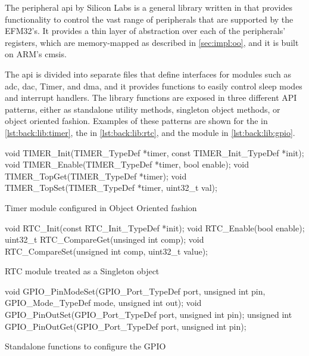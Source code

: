 The {\emlib} peripheral \gls{api} by Silicon Labs is a general library written in {\C} that provides functionality to control the vast range of peripherals that are supported by the EFM32's.
It provides a thin layer of abstraction over each of the peripherals' registers, which are memory-mapped as described in \autoref{sec:impl:oo}, and it is built on ARM's \gls{cmsis}.

The \gls{api} is divided into separate files that define interfaces for modules such as \gls{adc}, \gls{dac}, Timer, and \gls{dma}, and it provides functions to easily control sleep modes and interrupt handlers.
The library functions are exposed in three different API patterns, either as standalone utility methods, singleton object methods, or {\C} object oriented fashion.
Examples of these patterns are shown for the  in \autoref{lst:back:lib:timer}, the  in \autoref{lst:back:lib:rtc}, and the  module in \autoref{lst:back:lib:gpio}.

\begin{listing}[H]
  \begin{ccode}
void TIMER_Init(TIMER_TypeDef *timer,
                const TIMER_Init_TypeDef *init);
void TIMER_Enable(TIMER_TypeDef *timer, bool enable);
void TIMER_TopGet(TIMER_TypeDef *timer);
void TIMER_TopSet(TIMER_TypeDef *timer, uint32_t val);
  \end{ccode}
  \caption{Timer module configured in {\C} Object Oriented fashion}
  \label{lst:back:lib:timer}
\end{listing}

\begin{listing}[H]
  \begin{ccode}
void RTC_Init(const RTC_Init_TypeDef *init);
void RTC_Enable(bool enable);
uint32_t RTC_CompareGet(unsinged int comp);
void RTC_CompareSet(unsigned int comp, uint32_t value);
  \end{ccode}
  \caption{RTC module treated as a Singleton object}
  \label{lst:back:lib:rtc}
\end{listing}

\begin{listing}[H]
  \begin{ccode}
void GPIO_PinModeSet(GPIO_Port_TypeDef port, unsigned int pin,
                     GPIO_Mode_TypeDef mode, unsigned int out);
void GPIO_PinOutSet(GPIO_Port_TypeDef port, unsigned int pin);
unsigned int GPIO_PinOutGet(GPIO_Port_TypeDef port,
                            unsigned int pin);
  \end{ccode}
  \caption{Standalone functions to configure the GPIO}
  \label{lst:back:lib:gpio}
\end{listing}

